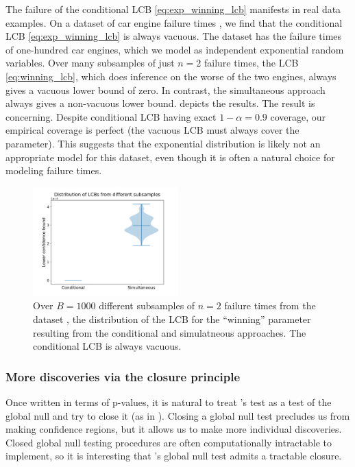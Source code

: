 \documentclass{article}
\begin{document}
The failure of the conditional LCB \eqref{eq:exp_winning_lcb} manifests in real data examples. On a dataset of car engine failure times \citep{Molotaliev}, we find that the conditional LCB \eqref{eq:exp_winning_lcb} is always vacuous. The dataset has the failure times of one-hundred car engines, which we model as independent exponential random variables. Over many subsamples of just $n=2$ failure times, the LCB \eqref{eq:winning_lcb}, which does inference on the worse of the two engines, always gives a vacuous lower bound of zero. In contrast, the simultaneous approach always gives a non-vacuous lower bound.  depicts the results. The result is concerning. Despite conditional LCB having exact $1-\alpha=0.9$ coverage, our empirical coverage is perfect (the vacuous LCB must always cover the parameter). This suggests that the exponential distribution is likely not an appropriate model for this dataset, even though it is often a natural choice for modeling failure times. 
\begin{figure}
    \centering
    \includegraphics[width=0.5\textwidth]{car_eng.pdf} %
    \caption{Over $B=1000$ different subsamples of $n=2$ failure times from the dataset \cite{Molotaliev}, the distribution of the LCB for the ``winning'' parameter resulting from the conditional and simulatneous approaches. The conditional LCB is always vacuous.}
    \label{fig:car_engine}
\end{figure}

\subsubsection{More discoveries via the closure principle}

Once written in terms of p-values, it is natural to treat 's test as a test of the global null and try to close it (as in \cite{Marcus}). Closing a global null test precludes us from making confidence regions, but it allows us to make more individual discoveries. Closed global null testing procedures are often computationally intractable to implement, so it is interesting that 's global null test admits a tractable closure.  
\end{document}
